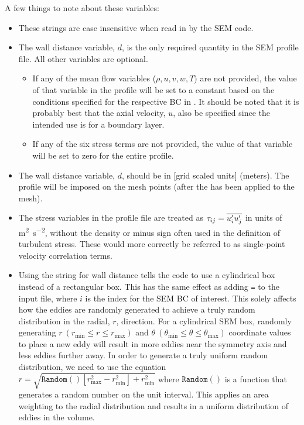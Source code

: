 \vspace{1.0em}%
\noindent
A few things to note about these variables:
\begin{itemize}
  \item These strings are case insensitive when read in by the SEM code.
  \item The wall distance variable, $d$, is the only required quantity in the
    SEM profile file. All other variables are optional.
    \begin{itemize}
      \item If any of the mean flow variables ($\rho, u, v, w, T$) are not
        provided, the value of that variable in the profile will be set to a
        constant based on the conditions specified for the respective BC in
        .
        It should be noted that it is probably best that the
        axial velocity, $u$, also be specified since the intended use is for a
        boundary layer.
      \item If any of the six stress terms are not provided, the value of that
        variable will be set to zero for the entire profile.
    \end{itemize}
  \item The wall distance variable, $d$, should be in
    [grid scaled units]
    (\thatis meters).
    The profile will be imposed on the mesh points 
    (after the 
    has been applied to the mesh).
  \item The stress variables in the profile file are treated as
    $\tau_{ij} = \overline{u'_{i}u'_{j}}$
    in units of \unit{\m\squared\per\s\squared},
    without the density or minus sign often used in the definition of
    turbulent stress.
    These would more correctly be referred to as single-point velocity
    correlation terms.
  \item Using the string  for wall distance tells the code
    to use a cylindrical box instead of a rectangular box. This has the same
    effect as adding
    \texttt{=}\tru{}
    to the input file, where $i$ is the index for the SEM BC of interest.
    This solely affects how the eddies are randomly generated to achieve a
    truly random distribution in the radial, $r$, direction.
    For a cylindrical SEM box, randomly generating
    $r\ (r_{\textrm{min}}\le r \le r_{\textrm{max}})$ and
    $\theta\ (\theta_{\textrm{min}}\le \theta \le \theta_{\textrm{max}})$
    coordinate values to place a new eddy will result in
    more eddies near the symmetry axis and
    less eddies further away.
    In order to generate a truly uniform random distribution,
    we need to use the equation
      $r=\sqrt{\mathtt{Random}()\left[ r^2_{\textrm{max}}
                                     - r^2_{\textrm{min}}
                                \right] + r^2_{\textrm{min}}}$
    where $\mathtt{Random}()$ is a function that generates a random number
    on the unit interval.
    This applies an area weighting to the radial distribution and
    results in a uniform distribution of eddies in the volume.


\end{itemize}
